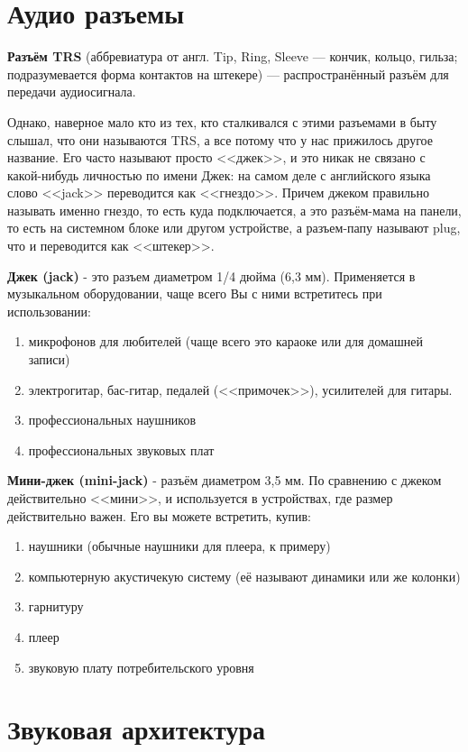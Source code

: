 \section{Аудио разъемы}

\textbf{Разъём TRS} (аббревиатура от англ. Tip, Ring, Sleeve — кончик, кольцо, гильза; подразумевается форма контактов на штекере) — распространённый разъём для передачи аудиосигнала. \cite{wiki-trs}

Однако, наверное мало кто из тех, кто сталкивался с этими разъемами в быту слышал, что они называются TRS, а все потому что у нас прижилось другое название. Его часто называют просто <<джек>>, и это никак не связано с какой-нибудь личностью по имени Джек: на самом деле с английского языка слово <<jack>> переводится как <<гнездо>>. Причем джеком правильно называть именно гнездо, то есть куда подключается, а это разъём-мама на панели, то есть на системном блоке или другом устройстве, а разъем-папу называют plug, что и переводится как <<штекер>>. \cite{kkg-jack}

\textbf{Джек (jack)} - это разъем диаметром 1/4 дюйма (6,3 мм). Применяется в музыкальном оборудовании, чаще всего Вы с ними встретитесь при использовании:
\begin{enumerate}
\item микрофонов для любителей (чаще всего это караоке или для домашней записи)
\item электрогитар, бас-гитар, педалей (<<примочек>>), усилителей для гитары.
\item профессиональных наушников
\item профессиональных звуковых плат
\end{enumerate}

\textbf{Мини-джек (mini-jack)} - разъём диаметром 3,5 мм. По сравнению с джеком действительно <<мини>>, и используется в устройствах, где размер действительно важен. Его вы можете встретить, купив:
\begin{enumerate}
\item наушники (обычные наушники для плеера, к примеру)
\item компьютерную акустичекую систему (её называют динамики или же колонки) 
\item гарнитуру
\item плеер
\item звуковую плату потребительского уровня
\end{enumerate}

\section{Звуковая архитектура}

